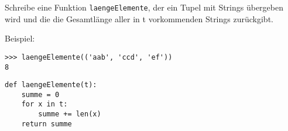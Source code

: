 \question[3]
Schreibe eine Funktion
\texttt{laengeElemente}, der ein Tupel mit Strings übergeben wird und die
die Gesamtlänge aller in t vorkommenden Strings
zurückgibt.

Beispiel:
\begin{lstlisting}
>>> laengeElemente(('aab', 'ccd', 'ef'))
8
\end{lstlisting}
\begin{solutionbox}{4cm}
\begin{lstlisting}
def laengeElemente(t):
    summe = 0
    for x in t:
        summe += len(x)
    return summe
\end{lstlisting}
\end{solutionbox}
